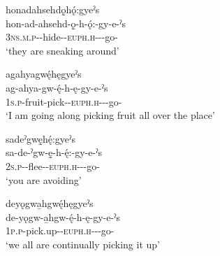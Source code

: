 \ex honadahsehdǫ̱hǫ́:gyeˀs\\
\gll hon-ad-ahsehd-ǫ̱-h-ǫ́:-gy-e-ˀs\\
 \textsc{3ns.m.p}-{\semireflexive}-hide-{\stative}-\textsc{euph.h}-{\joiner}-{\progressive}-go-{\habitual}\\
\glt `they are sneaking around'

\z
\z


\ea\label{ex:purpprogsufex15} 
\ea agahyagwę́hęgyeˀs\\
\gll ag-ahya-gw-ę́-h-ę-gy-e-ˀs\\
 \textsc{1s.p}-fruit-pick-{\stative}-\textsc{euph.h}-{\joiner}-{\progressive}-go-{\habitual}\\
\glt `I am going along picking fruit all over the place'

\ex sadeˀgwę̱hę́:gyeˀs\\
\gll sa-de-ˀgw-ę̱-h-ę́:-gy-e-ˀs\\
 \textsc{2s.p}-{\semireflexive}-flee-{\stative}-\textsc{euph.h}-{\joiner}-{\progressive}-go-{\habitual}\\
\glt `you are avoiding'


\ex deyǫgwa̱hgwę́hęgyeˀs\\
\gll de-yǫgw-a̱hgw-ę́-h-ę-gy-e-ˀs\\
 \textsc{1p.p}-pick.up-{\stative}-\textsc{euph.h}-{\joiner}-{\progressive}-go-{\habitual}\\
\glt `we all are continually picking it up'

